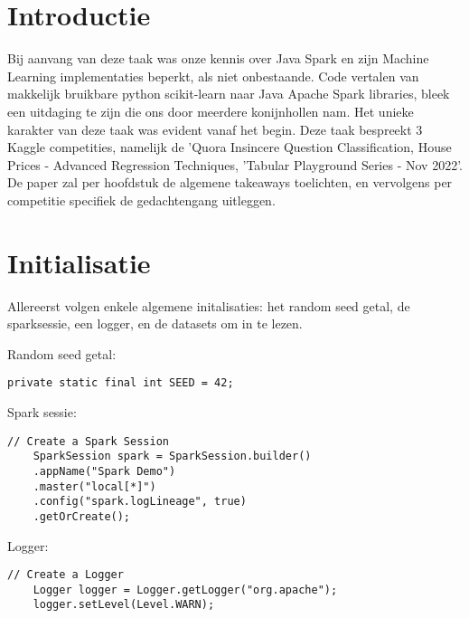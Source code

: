 
\section{Introductie} %
\label{sec:introduction}

Bij aanvang van deze taak was onze kennis over Java Spark en zijn Machine Learning implementaties beperkt, als niet onbestaande. Code vertalen van makkelijk bruikbare python scikit-learn naar Java Apache Spark libraries, bleek een uitdaging te zijn die ons door meerdere konijnhollen nam. Het unieke karakter van deze taak was evident vanaf het begin.
Deze taak bespreekt 3 Kaggle competities, namelijk de 'Quora Insincere Question Classification, House Prices - Advanced Regression Techniques, 'Tabular Playground Series - Nov 2022'. 
De paper zal per hoofdstuk de algemene takeaways toelichten, en vervolgens per competitie specifiek de gedachtengang uitleggen.

\section{Initialisatie}
\label{sec:intialisation}
Allereerst volgen enkele algemene initalisaties: het random seed getal, de sparksessie, een logger, en de datasets om in te lezen.

Random seed getal:

\begin{lstlisting}[style=codeStyle]
    private static final int SEED = 42;
\end{lstlisting}

Spark sessie:
\begin{lstlisting}[style=codeStyle]
// Create a Spark Session
    SparkSession spark = SparkSession.builder()
    .appName("Spark Demo")
    .master("local[*]")
    .config("spark.logLineage", true)
    .getOrCreate();
    \end{lstlisting}

Logger:
\begin{lstlisting}[style=codeStyle]
// Create a Logger
    Logger logger = Logger.getLogger("org.apache");
    logger.setLevel(Level.WARN);
\end{lstlisting}


